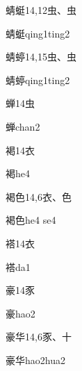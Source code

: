 \begin{Entry}{蜻蜓}{14,12}{⾍、⾍}
  \begin{Phonetics}{蜻蜓}{qing1ting2}
  \end{Phonetics}
\end{Entry}

\begin{Entry}{蜻蝏}{14,15}{⾍、⾍}
  \begin{Phonetics}{蜻蝏}{qing1ting2}
  \end{Phonetics}
\end{Entry}

\begin{Entry}{蝉}{14}{⾍}
  \begin{Phonetics}{蝉}{chan2}
  \end{Phonetics}
\end{Entry}

\begin{Entry}{褐}{14}{⾐}
  \begin{Phonetics}{褐}{he4}
  \end{Phonetics}
\end{Entry}

\begin{Entry}{褐色}{14,6}{⾐、⾊}
  \begin{Phonetics}{褐色}{he4 se4}
  \end{Phonetics}
\end{Entry}

\begin{Entry}{褡}{14}{⾐}
  \begin{Phonetics}{褡}{da1}
  \end{Phonetics}
\end{Entry}

\begin{Entry}{豪}{14}{⾗}
  \begin{Phonetics}{豪}{hao2}
  \end{Phonetics}
\end{Entry}

\begin{Entry}{豪华}{14,6}{⾗、⼗}
  \begin{Phonetics}{豪华}{hao2hua2}
  \end{Phonetics}
\end{Entry}

